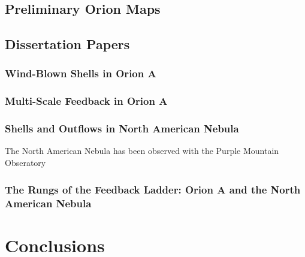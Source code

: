     \subsection{Preliminary Orion Maps}\label{sec:maps}
    
    
    \subsection{Dissertation Papers}\label{sec:papers}
        \subsubsection{Wind-Blown Shells in Orion A}\label{sec:paper1}
        \subsubsection{Multi-Scale Feedback in Orion A}\label{sec:paper2}
        \subsubsection{Shells and Outflows in North American Nebula}\label{sec:paper3}
        The North American Nebula has been observed with the Purple Mountain Obseratory 
        \subsubsection{The Rungs of the Feedback Ladder: Orion A and the North American Nebula}\label{sec:paper4}
\section{Conclusions}\label{sec:conclusions}
    
    


  
  